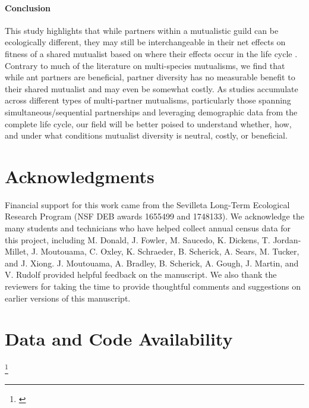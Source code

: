 \documentclass[11pt]{article}
\newcommand{\tom}[2]{{\color{red}{#1}}\footnote{\textit{\color{red}{#2}}}}
\newcommand{\revise}[1]{{\color{blue}{#1}}}
\begin{document}
\paragraph{Conclusion}
This study highlights that while partners within a mutualistic guild can be ecologically different, they may still be interchangeable in their net effects on fitness of a shared mutualist based on where their effects occur in the life cycle \revise{-- highlighting the importance of a demographic perspective in understanding the fitness consequences of mutualisms}. 
Contrary to much of the literature on multi-species mutualisms, we find that while ant partners are beneficial, partner diversity has no measurable benefit to their shared mutualist and may even be somewhat costly. 
As studies accumulate across different types of multi-partner mutualisms, particularly those spanning simultaneous/sequential partnerships and leveraging demographic data from the complete life cycle, our field will be better poised to understand whether, how, and under what conditions mutualist diversity is neutral, costly, or beneficial.


\section*{Acknowledgments}
Financial support for this work came from the Sevilleta Long-Term Ecological Research Program (NSF DEB awards 1655499 and 1748133).
We acknowledge the many students and technicians who have helped collect annual census data for this project, including M. Donald, J. Fowler, M. Saucedo, K. Dickens, T. Jordan-Millet, J. Moutouama, C. Oxley, K. Schraeder, B. Scherick, A. Sears, M. Tucker, and J. Xiong. 
J. Moutouama, A. Bradley, B. Scherick, A. Gough, J. Martin, and V. Rudolf provided helpful feedback on the manuscript. 
We also thank the reviewers for taking the time to provide thoughtful comments and suggestions on earlier versions of this manuscript.



\section*{Data and Code Availability}
\tom{This section will be filled out once double blind reviews are complete. }{Be sure to update this with the new data package.}
\end{document}
